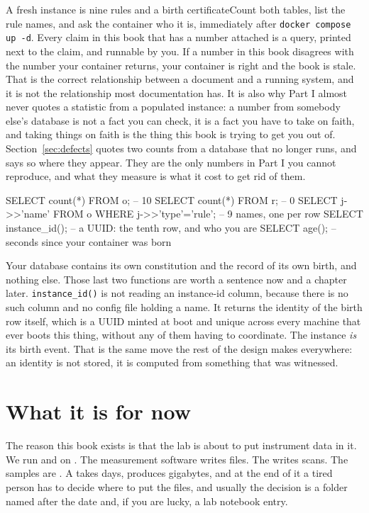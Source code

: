 \begin{Correspondence}{A fresh instance is nine rules and a birth certificate}{Count both tables, list the rule names, and ask the container who it is, immediately after \texttt{docker compose up -d}.}
Every claim in this book that has a number attached is a query, printed next to the claim, and runnable by you. If a number in this book disagrees with the number your container returns, your container is right and the book is stale. That is the correct relationship between a document and a running system, and it is not the relationship most documentation has. It is also why Part I almost never quotes a statistic from a populated instance: a number from somebody else's database is not a fact you can check, it is a fact you have to take on faith, and taking things on faith is the thing this book is trying to get you out of. Section~\ref{sec:defects} quotes two counts from a database that no longer runs, and says so where they appear. They are the only numbers in Part I you cannot reproduce, and what they measure is what it cost to get rid of them.
\begin{Check}
SELECT count(*) FROM o;                              -- 10
SELECT count(*) FROM r;                              -- 0
SELECT j->>'name' FROM o WHERE j->>'type'='rule';    -- 9 names, one per row
SELECT instance_id();                                -- a UUID: the tenth row, and who you are
SELECT age();                                        -- seconds since your container was born
\end{Check}
Your database contains its own constitution and the record of its own birth, and nothing else. Those last two functions are worth a sentence now and a chapter later. \texttt{instance\_id()} is not reading an instance-id column, because there is no such column and no config file holding a name. It returns the identity of the birth row itself, which is a UUID minted at boot and unique across every machine that ever boots this thing, without any of them having to coordinate. The instance \emph{is} its birth event. That is the same move the rest of the design makes everywhere: an identity is not stored, it is computed from something that was witnessed.
\end{Correspondence}

\section{What it is for now}

The reason this book exists is that the lab is about to put instrument data in it. We run \labColdSystem{} and \labMagnet{} on \labLocation{}. The measurement software writes \labFileFormat{} files. The \labInstrument{} writes scans. The samples are \labMaterialShort{} \labSampleClass{}. A \labRun{} takes days, produces gigabytes, and at the end of it a tired person has to decide where to put the files, and usually the decision is a folder named after the date and, if you are lucky, a lab notebook entry.

